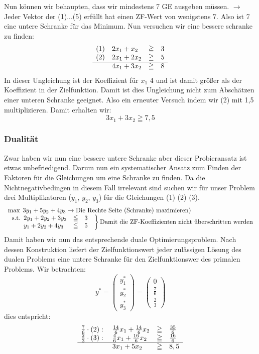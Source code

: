 \documentclass[12pt,titlepage,a4paper] {report}
\begin{document}
Nun können wir behaupten, dass wir mindestens 7 GE ausgeben müssen.
$\rightarrow$ Jeder Vektor der (1)...(5) erfüllt hat einen ZF-Wert von
wenigstens 7. Also ist 7 eine untere Schranke für das Minimum. Nun versuchen
wir eine bessere schranke zu finden:
\[\begin{array}{llcl}
(1)&2x_{1}+x_{2} &\geqq& 3\\
(2)&2x_{1}+2x_{2}&\geqq&5\\
\hline
&4x_{1} + 3x_{2}&\geqq& 8
\end{array}\]
In dieser Ungleichung ist der Koeffizient für $x_{1}$ 4 und ist damit
größer als der Koeffizient in der Zielfunktion. Damit ist dies Ungleichung
nicht zum Abschätzen einer unteren Schranke geeignet. Also ein erneuter
Versuch indem wir (2) mit 1,5 multiplizieren. Damit erhalten wir:
\[3x_{1}+3x_{2} \geqq 7,5\]

\subsubsection{Dualität}

Zwar haben wir nun eine bessere untere Schranke aber dieser Probieransatz ist
etwas unbefriedigend. Darum nun ein systematischer Ansatz
zum Finden der Faktoren für die Gleichungen um eine Schranke zu finden. Da
die Nichtnegativbedingen in diesem Fall irrelevant sind suchen wir für
unser Problem drei Multiplikatoren ($y_{1}$, $y_{2}$, $y_{3}$) für die
Gleichungen (1) (2) (3).
\[\begin{array}{l}\max \; 3y_{1} + 5y_{2} + 4y_{3} \rightarrow \mbox{Die Rechte
Seite (Schranke) maximieren)}\\
\left.\begin{array}{l}\mbox{s.t.}\begin{array}[t]{lcl}
2y_{1}+2y_{2}+3y_{3} &\leqq & 3 \\
y_{1}+2y_{2}+4y_{3} &\leqq & 5
\end{array} \end{array} \right\}\mbox{Damit die ZF-Koeffizienten nicht
überschritten werden}\end{array}\]
Damit haben wir nun das entsprechende duale Optimierungsproblem. Nach
dessen Konstruktion liefert der Zielfunktionswert jeder zulässigen Lösung
des dualen Problems eine untere Schranke für den Zielfunktionswer des
primalen Problems. Wir betrachten:
\[y^{*}=\left(\begin{array}{c}y^{*}_{1}\\y^{*}_{2}\\y^{*}_{3}\end{array}\right)
=\left(\begin{array}{c}0\\\frac{7}{6}\\\frac{2}{3}\end{array}\right)\] 
dies entspricht:
\[\begin{array}{llcl}
\frac{7}{6} \cdot (2):\; & \frac{14}{6}x_{1} + \frac{14}{6}x_{2} &\geqq&
\frac{35}{6}\\
\frac{2}{3} \cdot (3):\; & \frac{4}{6}x_{1} + \frac{16}{6}x_{2} &\geqq&
\frac{16}{6}\\
\hline
&3x_{1} + 5x_{2} &\geqq& 8,5
\end{array}
\]
\end{document}
